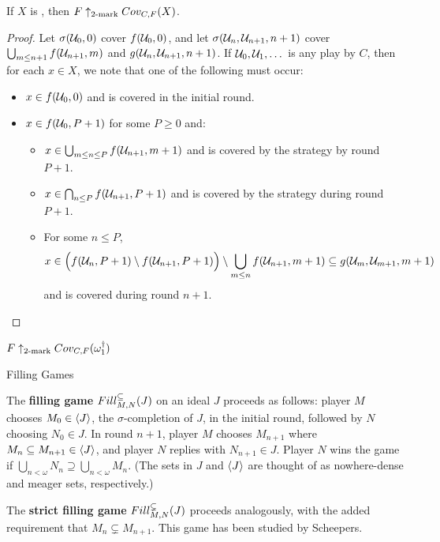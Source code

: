   \begin{theorem}
    If $X$ is \scish, then $F \uparrow_{2\text{-mark}}Cov_{C,F}(X)$.
  \end{theorem}

  \begin{proof}
    Let $\sigma(\mathcal{U}_0,0)$ cover $f(\mathcal{U}_0,0)$, and let $\sigma(\mathcal{U}_n,\mathcal{U}_{n+1},n+1)$ cover $\bigcup_{m\leq n+1}f(\mathcal{U}_{n+1},m)$ and $g(\mathcal{U}_n,\mathcal{U}_{n+1},n+1)$. If $\mathcal{U}_0,\mathcal{U}_1,\dots$ is any play by $C$, then for each $x\in X$, we note that one of the following must occur:
      \begin{itemize}
        \item $x \in f(\mathcal{U}_0,0)$ and is covered in the initial round.
        \item $x \in f(\mathcal{U}_0,P+1)$ for some $P\geq 0$ and:
        \begin{itemize}
          \item $x\in \bigcup_{m\leq n\leq P} f(\mathcal{U}_{n+1},m+1)$ and is covered by the strategy by round $P+1$.
          \item $x\in \bigcap_{n\leq P} f(\mathcal{U}_{n+1},P+1)$ and is covered by the strategy during round $P+1$.
          \item For some $n \leq P$, 
            \[x \in \Big( f(\mathcal{U}_{n},P+1)\setminus f(\mathcal{U}_{n+1},P+1) \Big)\setminus \bigcup_{m\leq n} f(\mathcal{U}_{n+1},m+1) \subseteq g(\mathcal{U}_m,\mathcal{U}_{m+1},m+1)\]
           and is covered during round $n+1$.
         \end{itemize}
      \end{itemize}
  \end{proof}

  \begin{corollary}
    $F\uparrow_{2\text{-mark}}Cov_{C,F}(\omega_1^\dagger)$
  \end{corollary}


\newpage

  \centerline{Filling Games}

  \begin{definition}
    The \textbf{filling game} $Fill^{\subseteq}_{M,N}(J)$ on an ideal $J$ proceeds as follows: player $M$ chooses $M_0 \in \langle J\rangle$, the $\sigma$-completion of $J$, in the initial round, followed by $N$ choosing $N_0\in J$. In round $n+1$, player $M$ chooses $M_{n+1}$ where $M_n\subseteq M_{n+1}\in\langle J\rangle$, and player $N$ replies with $N_{n+1}\in J$. Player $N$ wins the game if $\bigcup_{n<\omega} N_n \supseteq \bigcup_{n<\omega} M_n$. (The sets in $J$ and $\langle J\rangle$ are thought of as nowhere-dense and meager sets, respectively.)

    The \textbf{strict filling game} $Fill^{\subsetneq}_{M,N}(J)$ proceeds analogously, with the added requirement that $M_n\subsetneq M_{n+1}$. This game has been studied by Scheepers.
  \end{definition}

